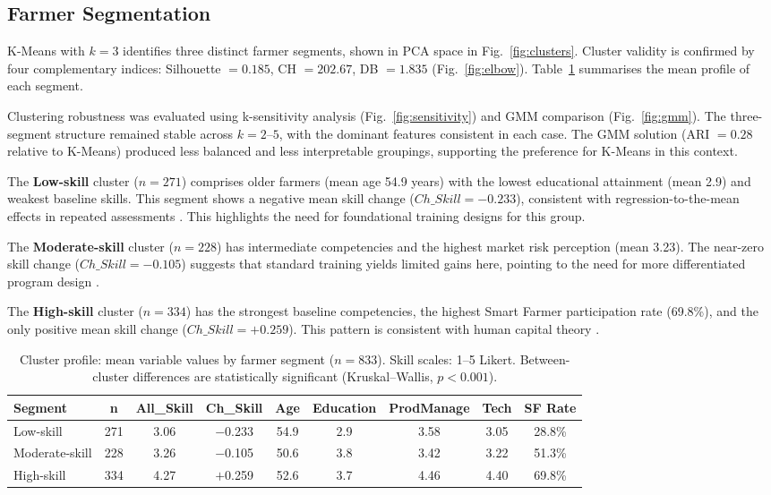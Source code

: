 \documentclass[3p,twocolumn,authoryear]{elsarticle}
\begin{document}
\subsection{Farmer Segmentation}

K-Means with $k = 3$ identifies three distinct farmer segments, shown in
PCA space in Fig.~\ref{fig:clusters}.
Cluster validity is confirmed by four complementary indices: Silhouette
$= 0.185$, CH $= 202.67$, DB $= 1.835$ (Fig.~\ref{fig:elbow}).
Table~\ref{tab:cluster_profile} summarises the mean profile of each
segment.

Clustering robustness was evaluated using k-sensitivity analysis
(Fig.~\ref{fig:sensitivity}) and GMM comparison
(Fig.~\ref{fig:gmm}).
The three-segment structure remained stable across $k = 2$--$5$, with
the dominant features consistent in each case.
The GMM solution (ARI $= 0.28$ relative to K-Means) produced less
balanced and less interpretable groupings, supporting the preference
for K-Means in this context.

The \textbf{Low-skill} cluster ($n = 271$) comprises older farmers
(mean age 54.9 years) with the lowest educational attainment (mean 2.9)
and weakest baseline skills.
This segment shows a negative mean skill change ($Ch\_Skill = -0.233$),
consistent with regression-to-the-mean effects in repeated assessments
\citep{davis2012}.
This highlights the need for foundational training designs for this group.

The \textbf{Moderate-skill} cluster ($n = 228$) has intermediate
competencies and the highest market risk perception (mean 3.23).
The near-zero skill change ($Ch\_Skill = -0.105$) suggests that standard
training yields limited gains here, pointing to the need for more
differentiated program design \citep{anderson2004}.

The \textbf{High-skill} cluster ($n = 334$) has the strongest baseline
competencies, the highest Smart Farmer participation rate (69.8\%), and
the only positive mean skill change ($Ch\_Skill = +0.259$).
This pattern is consistent with human capital theory
\citep{feder1985,davis2012}.

\begin{table}[htbp]
\centering
\caption{Cluster profile: mean variable values by farmer segment
($n = 833$). Skill scales: 1--5 Likert. Between-cluster differences
are statistically significant (Kruskal--Wallis, $p < 0.001$).}
\label{tab:cluster_profile}
\begin{tabular}{@{}lcccccccc@{}}
\toprule
\textbf{Segment} & \textbf{n} & \textbf{All\_Skill}
  & \textbf{Ch\_Skill} & \textbf{Age}
  & \textbf{Education} & \textbf{ProdManage}
  & \textbf{Tech} & \textbf{SF Rate} \\
\midrule
Low-skill      & 271 & 3.06 & $-$0.233 & 54.9 & 2.9 & 3.58 & 3.05 & 28.8\% \\
Moderate-skill & 228 & 3.26 & $-$0.105 & 50.6 & 3.8 & 3.42 & 3.22 & 51.3\% \\
High-skill     & 334 & 4.27 & $+$0.259 & 52.6 & 3.7 & 4.46 & 4.40 & 69.8\% \\
\bottomrule
\end{tabular}
\end{table}
\end{document}
